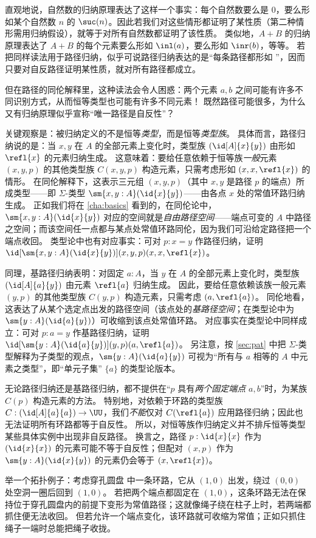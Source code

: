 \begin{rmk}\label{rmk:the-only-path-is-refl}
  直观地说，自然数的归纳原理表达了这样一个事实：每个自然数要么是 $0$，要么形如某个自然数 $n$ 的 $\suc(n)$。因此若我们对这些情形都证明了某性质（第二种情形需用归纳假设），就等于对所有自然数都证明了该性质。
  类似地，$A+B$ 的归纳原理表达了 $A+B$ 的每个元素要么形如 $\inl(a)$，要么形如 $\inr(b)$，等等。
  若把同样读法用于路径归纳，似乎可说路径归纳表达的是“每条路径都形如 ”，因而只要对自反路径证明某性质，就对所有路径都成立。

  但在路径的同伦解释里，这种读法会令人困惑：两个元素 $a,b$ 之间可能有许多不同识别方式，从而恒等类型也可能有许多不同元素！
  既然路径可能很多，为什么又有归纳原理似乎宣称“唯一路径是自反性”？

关键观察是：被归纳定义的不是恒等\emph{类型}，而是恒等\emph{类型族}。
具体而言，路径归纳说的是：当 $x,y$ 在 $A$ 的全部元素上变化时，类型族 $(\id[A]{x}{y})$ 由形如 $\refl{x}$ 的元素归纳生成。
这意味着：要给任意依赖于恒等族\emph{一般}元素 $(x,y,p)$ 的其他类型族 $C(x,y,p)$ 构造元素，只需考虑形如 $(x,x,\refl{x})$ 的情形。
在同伦解释下，这表示三元组 $(x,y,p)$（其中 $x,y$ 是路径 $p$ 的端点）所成类型——即 $\Sigma$-类型 $\sm{x,y:A}(\id{x}{y})$——由各点 $x$ 处的常值环路归纳生成。
正如我们将在 \cref{cha:basics} 看到的，在同伦论中，$\sm{x,y:A}(\id{x}{y})$ 对应的空间就是\emph{自由路径空间}——端点可变的 $A$ 中路径之空间；而该空间任一点都与某点处常值环路同伦，因为我们可沿给定路径把一个端点收回。
类型论中也有对应事实：可对 $p:x=y$ 作路径归纳，证明 $\id[\sm{x,y:A}(\id{x}{y})]{(x,y,p)}{(x,x,\refl{x})}$。

同理，基路径归纳表明：对固定 $a:A$，当 $y$ 在 $A$ 的全部元素上变化时，类型族 $(\id[A]{a}{y})$ 由元素 $\refl{a}$ 归纳生成。
因此，要给任意依赖该族一般元素 $(y,p)$ 的其他类型族 $C(y,p)$ 构造元素，只需考虑 $(a,\refl{a})$。
同伦地看，这表达了从某个选定点出发的路径空间（该点处的\emph{基路径空间}；在类型论中为 $\sm{y:A} (\id{a}{y})$）可收缩到该点处常值环路。
对应事实在类型论中同样成立：可对 $p:a=y$ 作基路径归纳，证明 $\id[\sm{y:A}(\id{a}{y})]{(y,p)}{(a,\refl{a})}$。
另注意，按 \cref{sec:pat} 中把 $\Sigma$-类型解释为子类型的观点，$\sm{y:A}(\id{a}{y})$ 可视为“所有与 $a$ 相等的 $A$ 中元素之类型”，即“单元子集” $\{a\}$ 的类型论版本。

无论路径归纳还是基路径归纳，都不提供在“$p$ 具有\emph{两个固定端点} $a,b$”时，为某族 $C(p)$ 构造元素的方法。
特别地，对依赖于环路的类型族 $C: (\id[A]{a}{a}) \to \UU$，我们\emph{不能}仅对 $C(\refl{a})$ 应用路径归纳；因此也无法证明所有环路都等于自反性。
所以，对恒等族作归纳定义并不排斥恒等类型某些具体实例中出现非自反路径。
换言之，路径 $p:\id{x}{x}$ 作为 $(\id{x}{x})$ 的元素可能不等于自反性；但配对 $(x,p)$ 作为 $\sm{y:A}(\id{x}{y})$ 的元素仍会等于 $(x,\refl{x})$。

举一个拓扑例子：考虑穿孔圆盘  中一条环路，它从 $(1,0)$ 出发，绕过 $(0,0)$ 处空洞一圈后回到 $(1,0)$。
若把两个端点都固定在 $(1,0)$，这条环路无法在保持位于穿孔圆盘内的前提下变形为常值路径；这就像绳子绕在柱子上时，若两端都抓住便无法收回。
但若允许一个端点变化，该环路就可收缩为常值；正如只抓住绳子一端时总能把绳子收拢。
\end{rmk}

